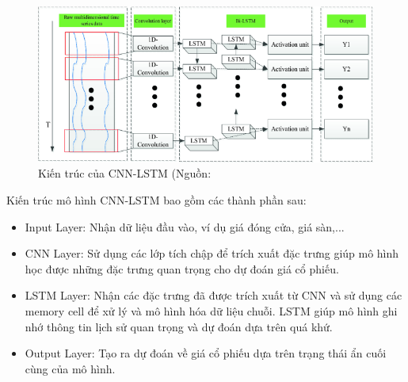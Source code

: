 \documentclass[conference]{IEEEtran}
\begin{document}
\begin{figure}[H]
    \centering
    \begin{minipage}{0.8\linewidth}
    \centering
        \includegraphics[width=0.8\linewidth]{images/CNNLSTM.png}
    \caption{Kiến trúc của CNN-LSTM (Nguồn: \cite{CNNLSTMTimeSeries}}
    \label{fig10}
    \end{minipage}
\end{figure}
Kiến trúc mô hình CNN-LSTM bao gồm các thành phần sau:
\begin{itemize}
    \item Input Layer: Nhận dữ liệu đầu vào, ví dụ giá đóng cửa, giá sàn,...
    \item CNN Layer: Sử dụng các lớp tích chập để trích xuất đặc trưng giúp mô hình học được những đặc trưng quan trọng cho dự đoán giá cổ phiếu.
    \item LSTM Layer: Nhận các đặc trưng đã được trích xuất từ CNN và sử dụng các memory cell để xử lý và mô hình hóa dữ liệu chuỗi. LSTM giúp mô hình ghi nhớ thông tin lịch sử quan trọng và dự đoán dựa trên quá khứ.
    \item Output Layer: Tạo ra dự đoán về giá cổ phiếu dựa trên trạng thái ẩn cuối cùng của mô hình.
\end{itemize}
\end{document}

